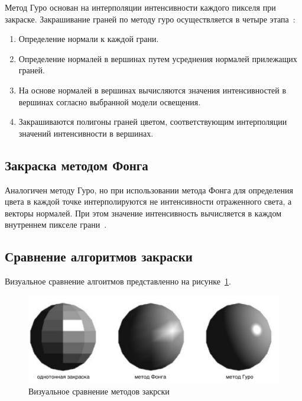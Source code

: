     Метод Гуро основан на интерполяции интенсивности каждого пикселя при закраске. Закрашивание граней по методу гуро осуществляется в четыре этапа~\cite{porev}:
    
    \begin{enumerate}
    	\item [1)] Определение нормали к каждой грани.
    	\item [2)] Определение нормалей в вершинах путем усреднения нормалей прилежащих граней.
    	\item [3)] На основе нормалей в вершинах вычисляются значения интенсивностей в вершинах согласно выбранной модели освещения.
    	\item [4)] Закрашиваются полигоны граней цветом, соответствующим интерполяции значений интенсивности в вершинах.
    \end{enumerate}
    
    \subsection{Закраска методом Фонга}
    
    Аналогичен методу Гуро, но при использовании метода Фонга для определения цвета в каждой точке интерполируются не интенсивности отраженного света, а векторы нормалей. При этом значение интенсивность вычисляется в каждом внутреннем пикселе грани~\cite{rogers,porev}.
    
    \subsection{Сравнение алгоритмов закраски}
    
    Визуальное сравнение алгоитмов представленно на рисунке~\ref{fig:shading_comparison}.
    
    \begin{figure}[H]
    	\centering
    	\includegraphics[width=1\textwidth]{../inc/images/shading_2}
    	\caption{Визуальное сравнение методов закрски}
	    \label{fig:shading_comparison}
    \end{figure}
    

